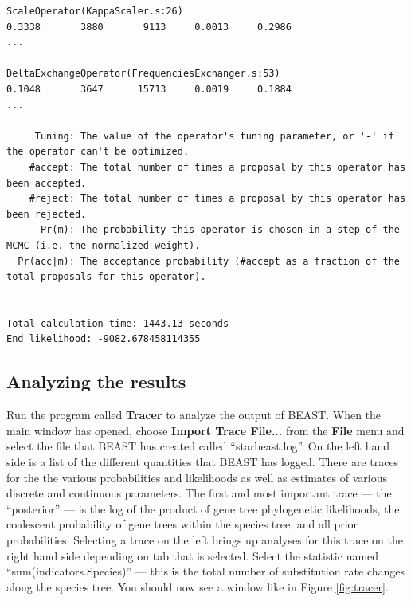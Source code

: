 \documentclass{article}
\begin{document}
{\begin{verbatim}
ScaleOperator(KappaScaler.s:26)                                         0.3338       3880       9113     0.0013     0.2986 
...

DeltaExchangeOperator(FrequenciesExchanger.s:53)                        0.1048       3647      15713     0.0019     0.1884 
...

     Tuning: The value of the operator's tuning parameter, or '-' if the operator can't be optimized.
    #accept: The total number of times a proposal by this operator has been accepted.
    #reject: The total number of times a proposal by this operator has been rejected.
      Pr(m): The probability this operator is chosen in a step of the MCMC (i.e. the normalized weight).
  Pr(acc|m): The acceptance probability (#accept as a fraction of the total proposals for this operator).


Total calculation time: 1443.13 seconds
End likelihood: -9082.678458114355
\end{verbatim}}

\subsection*{Analyzing the results}

Run the program called \textbf{Tracer} to analyze the output of BEAST. When the
main window has opened, choose \textbf{Import Trace File...} from the
\textbf{File} menu and select the file that BEAST has created called
``starbeast.log''. On the left hand side is a list of the different quantities
that BEAST has logged. There are traces for the the various probabilities and
likelihoods as well as estimates of various discrete and continuous parameters.
The first and most important trace --- the ``posterior'' --- is the log of the
product of gene tree phylogenetic likelihoods, the coalescent probability of
gene trees within the species tree, and all prior probabilities.
Selecting a trace on the left brings up analyses for this trace on the right
hand side depending on tab that is selected. Select the statistic named
``sum(indicators.Species)'' --- this is the total number of substitution rate
changes along the species tree. You should now see a window like in Figure
\ref{fig:tracer}.
\end{document}
